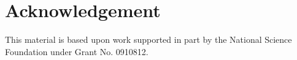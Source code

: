 \documentclass{sig-alternate}
\begin{document}
 
  
\section*{Acknowledgement} 
 
This material is based upon work supported in part by the National Science Foundation under Grant No. 0910812.

 
 
 
% 


 
\end{document}
